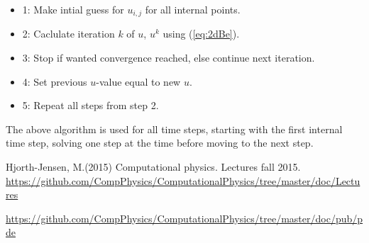 \documentclass{article}
\begin{document}
\begin{itemize}
	\item{1: Make intial guess for $u_{i,j}$ for all internal points.}
	\item{2: Caclulate iteration $k$ of $u$, $u^k$ using (\ref{eq:2dBe})}.
	\item{3: Stop if wanted convergence reached, else continue next iteration.}
	\item{4: Set previous $u$-value equal to new $u$.}
	\item{5: Repeat all steps from step 2.}
\end{itemize}

The above algorithm is used for all time steps, starting with the first internal time step, solving one step at the time before moving to the next step.



\begin{thebibliography}{9}
	Hjorth-Jensen, M.(2015)
	Computational physics. Lectures fall 2015. 
	\url{https://github.com/CompPhysics/ComputationalPhysics/tree/master/doc/Lectures}
	
	\url{https://github.com/CompPhysics/ComputationalPhysics/tree/master/doc/pub/pde}

\end{thebibliography}
\end{document}
